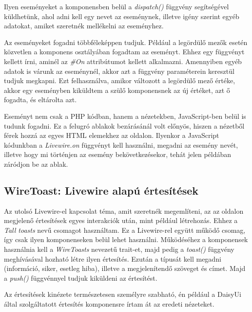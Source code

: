 \documentclass[
]{thesis-ekf}
\theoremstyle{definition}
\theoremstyle{remark}
\begin{document}
Ilyen eseményeket a komponensben belül a \emph{dispatch()} függvény segítségével küldhetünk, ahol adni kell egy nevet az eseménynek, illetve igény szerint egyéb adatokat, amiket szeretnék mellékelni az eseményhez.

Az eseményeket fogadni többféleképpen tudjuk. Például a legördülő mezők esetén közvetlen a komponens osztályában fogadtam az eseményt. Ehhez egy függvényt kellett írni, aminél az \emph{\#On} attribútumot kellett alkalmazni. Amennyiben egyéb adatok is várunk az eseménynél, akkor azt a függvény paraméterein keresztül tudjuk megkapni. Ezt felhasználva, amikor változott a legördülő mező értéke, akkor egy eseményben kiküldtem a szülő komponensnek az új értéket, azt ő fogadta, és eltárolta azt.

Eseményt nem csak a PHP kódban, hanem a nézetekben, JavaScript-ben belül is tudunk fogadni. Ez a felugró ablakok bezárásánál volt előnyös, hiszen a nézetből férek hozzá az egyes HTML elemekhez az oldalon. Ilyenkor a JavaScript kódunkban a \emph{Livewire.on} függvényt kell használni, megadni az esemény nevét, illetve hogy mi történjen az esemény bekövetkezésekor, tehát jelen példában záródjon be az ablak.



\subsection{WireToast: Livewire alapú értesítések}

Az utolsó Livewire-el kapcsolat téma, amit szeretnék megemlíteni, az az oldalon megjelenő értesítések egyes interakciók után, mint például létrehozás. Ehhez a \emph{Tall toasts}\cite{talltoasts} nevű csomagot használtam. Ez a Livewire-rel együtt működő csomag, így csak ilyen komponenseken belül lehet használni. Működéséhez a komponensek használnia kell a \emph{WireToasts} nevezetű trait-et, majd pedig a \emph{toast()} függvény meghívásával hozható létre ilyen értesítés. Ezután a típusát kell megadni (információ, siker, esetleg hiba), illetve a megjelenítendő szöveget és címet. Majd a \emph{push()} függvénnyel tudjuk kiküldeni az értesítést.



Az értesítések kinézete természetesen személyre szabható, én például a DaisyUi által szolgáltatott értesítés komponensre írtam át az eredeti nézeteket.
\end{document}
